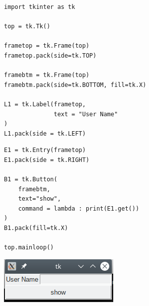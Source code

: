 \begin{frame}[fragile]
%
\begin{tcbraster}[raster columns=2,
                  raster equal height,
                  nobeforeafter,
                  raster column skip=0.5cm]
\begin{codebox}
\begin{verbatim}
import tkinter as tk

top = tk.Tk()

frametop = tk.Frame(top)
frametop.pack(side=tk.TOP)

framebtm = tk.Frame(top)
framebtm.pack(side=tk.BOTTOM, fill=tk.X)

L1 = tk.Label(frametop,
              text = "User Name"
)
L1.pack(side = tk.LEFT)
\end{verbatim}
\end{codebox}
%
\begin{codebox}[... Continued]
\begin{verbatim}
E1 = tk.Entry(frametop)
E1.pack(side = tk.RIGHT)

B1 = tk.Button(
    framebtm,
    text="show",
    command = lambda : print(E1.get())
)
B1.pack(fill=tk.X)

top.mainloop()
\end{verbatim}
\end{codebox}
\end{tcbraster}
%
\begin{center}
	\includegraphics[width=.25\linewidth]{./gfx/tk-entry}
\end{center}
%
\end{frame}


